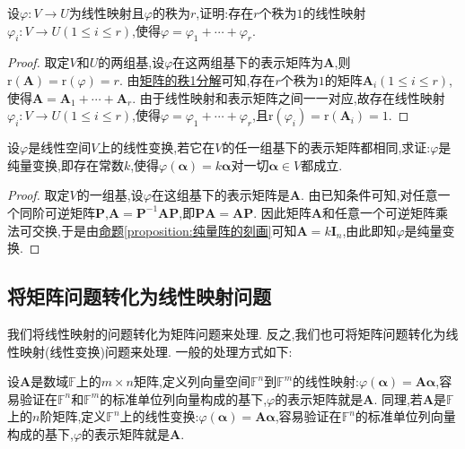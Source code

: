 \documentclass[../../main.tex]{subfiles}%
\begin{document}
\begin{proposition}\label{proposition:线性映射的秩1分解}
设\(\varphi:V\to U\)为线性映射且\(\varphi\)的秩为\(r\),证明:存在\(r\)个秩为\(1\)的线性映射\(\varphi_i:V\to U(1\leqslant  i\leqslant  r)\),使得\(\varphi=\varphi_1+\cdots+\varphi_r\).
\end{proposition}
\begin{proof}
取定\(V\)和\(U\)的两组基,设\(\varphi\)在这两组基下的表示矩阵为\(\boldsymbol{A}\),则\(\text{r}(\boldsymbol{A})=\text{r}(\varphi)=r\). 由\hyperref[proposition:矩阵的秩1分解]{矩阵的秩1分解}可知,存在\(r\)个秩为\(1\)的矩阵\(\boldsymbol{A}_i(1\leqslant  i\leqslant  r)\),使得\(\boldsymbol{A}=\boldsymbol{A}_1+\cdots+\boldsymbol{A}_r\). 由于线性映射和表示矩阵之间一一对应,故存在线性映射\(\varphi_i:V\to U(1\leqslant  i\leqslant  r)\),使得\(\varphi=\varphi_1+\cdots+\varphi_r\),且\(\text{r}(\varphi_i)=\text{r}(\boldsymbol{A}_i)=1\).
\end{proof}

\begin{proposition}\label{proposition:任一组基下的表示矩阵都相同的线性变换是纯量变换}
设\(\varphi\)是线性空间\(V\)上的线性变换,若它在\(V\)的任一组基下的表示矩阵都相同,求证:\(\varphi\)是纯量变换,即存在常数\(k\),使得\(\varphi(\boldsymbol{\alpha}) = k\boldsymbol{\alpha}\)对一切\(\boldsymbol{\alpha}\in V\)都成立.
\end{proposition}
\begin{proof}
取定\(V\)的一组基,设\(\varphi\)在这组基下的表示矩阵是\(\boldsymbol{A}\). 由已知条件可知,对任意一个同阶可逆矩阵\(\boldsymbol{P}\),\(\boldsymbol{A}=\boldsymbol{P}^{-1}\boldsymbol{A}\boldsymbol{P}\),即\(\boldsymbol{P}\boldsymbol{A}=\boldsymbol{A}\boldsymbol{P}\). 因此矩阵\(\boldsymbol{A}\)和任意一个可逆矩阵乘法可交换,于是由\hyperref[proposition:纯量阵的刻画]{命题\ref{proposition:纯量阵的刻画}}可知\(\boldsymbol{A}=k\boldsymbol{I}_n\),由此即知\(\varphi\)是纯量变换.
\end{proof}

\subsection{将矩阵问题转化为线性映射问题}
我们将线性映射的问题转化为矩阵问题来处理. 反之,我们也可将矩阵问题转化为线性映射(线性变换)问题来处理. 一般的处理方式如下:

设\(\boldsymbol{A}\)是数域\(\mathbb{F}\)上的\(m\times n\)矩阵,定义列向量空间\(\mathbb{F}^n\)到\(\mathbb{F}^m\)的线性映射:\(\varphi(\boldsymbol{\alpha})=\boldsymbol{A}\boldsymbol{\alpha}\),容易验证在\(\mathbb{F}^n\)和\(\mathbb{F}^m\)的标准单位列向量构成的基下,\(\varphi\)的表示矩阵就是\(\boldsymbol{A}\). 同理,若\(\boldsymbol{A}\)是\(\mathbb{F}\)上的\(n\)阶矩阵,定义\(\mathbb{F}^n\)上的线性变换:\(\varphi(\boldsymbol{\alpha})=\boldsymbol{A}\boldsymbol{\alpha}\),容易验证在\(\mathbb{F}^n\)的标准单位列向量构成的基下,\(\varphi\)的表示矩阵就是\(\boldsymbol{A}\). 
\end{document}
